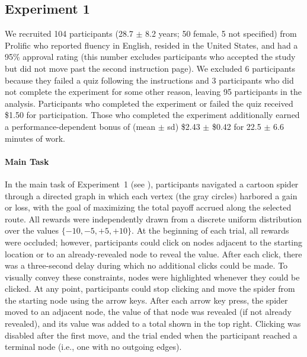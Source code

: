 \subsection{Experiment 1} \label{sec:planning-methods1}
We recruited 104 participants (28.7 $\pm$ 8.2 years; 50 female, 5 not specified) from Prolific who reported fluency in English, resided in the United States, and had a 95\% approval rating (this number excludes participants who accepted the study but did not move past the second instruction page). We excluded 6 participants because they failed a quiz following the instructions and 3 participants who did not complete the experiment for some other reason, leaving 95 participants in the analysis. Participants who completed the experiment or failed the quiz received \$1.50 for participation. Those who completed the experiment additionally earned a performance-dependent bonus of (mean $\pm$ sd) \$2.43 $\pm$ \$0.42 for 22.5 $\pm$ 6.6 minutes of work.

\paragraph{Main Task}
In the main task of Experiment~1 (see ), participants navigated a cartoon spider through a directed graph in which each vertex (the gray circles) harbored a gain or loss, with the goal of maximizing the total payoff accrued along the selected route. All rewards were independently drawn from a discrete uniform distribution over the values $\{-10,-5, +5, +10\}$. At the beginning of each trial, all rewards were occluded; however, participants could click on nodes adjacent to the starting location or to an already-revealed node to reveal the value. After each click, there was a three-second delay during which no additional clicks could be made. To visually convey these constraints, nodes were highlighted whenever they could be clicked. At any point, participants could stop clicking and move the spider from the starting node using the arrow keys. After each arrow key press, the spider moved to an adjacent node, the value of that node was revealed (if not already revealed), and its value was added to a total shown in the top right. Clicking was disabled after the first move, and the trial ended when the participant reached a terminal node (i.e., one with no outgoing edges).


